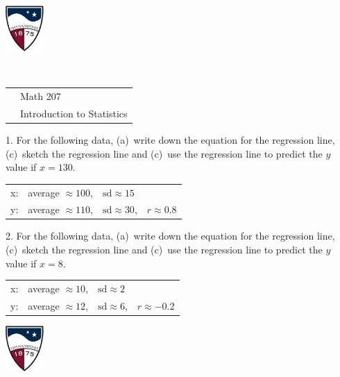 \documentclass[10pt]{article}
\begin{document}
\pagestyle{empty}
\href{http://www.su.edu}{\includegraphics[height=1.75cm]{sulogo.eps}}
\vspace{-1.69cm}

{\small{\ }\hfill
\begin{tabular}{cl}
& Math 207\\& Introduction to Statistics\\
\end{tabular}
}
\setlength{\baselineskip}{1.05\baselineskip}
\vspace{.3in}

1. For the following data, (a)~write down the equation for the regression line, 
(c)~sketch the regression line and (c)~use the regression line to predict the $y$ value
if $x=130$.\vspace{-8pt}
\begin{center}
\begin{tabular}{llll}
x: & average $\approx 100$, & $\mbox{sd}\approx 15$\\
y: & average $\approx 110$, & $\mbox{sd}\approx 30$,  & $r\approx 0.8$\\
\end{tabular}
\end{center}
\vspace{1.25in}

2. For the following data, (a)~write down the equation for the regression line, 
(c)~sketch the regression line and (c)~use the regression line to predict the $y$ value
if $x=8$.\vspace{-8pt}
\begin{center}
\begin{tabular}{llll}
x: & average $\approx 10$, & $\mbox{sd}\approx 2$\\
y: & average $\approx 12$, & $\mbox{sd}\approx 6$,  & $r\approx -0.2$\\
\end{tabular}
\end{center}
\vfill\vfill
\href{http://www.su.edu}{\includegraphics[height=1.75cm]{sulogo.eps}}
\vspace{-1.69cm}
\end{document}
